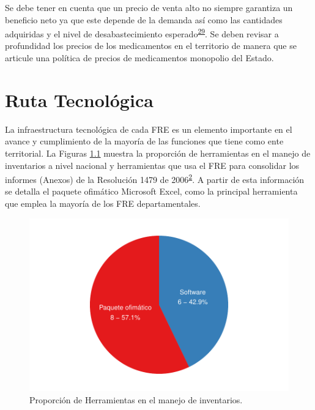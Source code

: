 \documentclass[
]{book}
\begin{document}
Se debe tener en cuenta que un precio de venta alto no siempre garantiza un beneficio neto ya que este depende de la demanda así como las cantidades adquiridas y el nivel de desabastecimiento esperado\textsuperscript{\protect\hyperlink{ref-Silver2017}{29}}. Se deben revisar a profundidad los precios de los medicamentos en el territorio de manera que se articule una política de precios de medicamentos monopolio del Estado.

\hypertarget{ruta-tecnoluxf3gica}{%
\chapter{Ruta Tecnológica}\label{ruta-tecnoluxf3gica}}


La infraestructura tecnológica de cada FRE es un elemento importante en el avance y cumplimiento de la mayoría de las funciones que tiene como ente territorial. La Figuras \ref{fig:PropHerramientasManejoInventarios} muestra la proporción de herramientas en el manejo de inventarios a nivel nacional y herramientas que usa el FRE para consolidar los informes (Anexos) de la Resolución 1479 de 2006\textsuperscript{\protect\hyperlink{ref-MSPS1479-2006}{2}}. A partir de esta información se detalla el paquete ofimático Microsoft Excel, como la principal herramienta que emplea la mayoría de los FRE departamentales.

\begin{figure}

{\centering \includegraphics[width=0.85\linewidth]{InformeFinal_files/figure-latex/PropHerramientasManejoInventarios-1} 

}

\caption{Proporción de Herramientas en el manejo de inventarios.}\label{fig:PropHerramientasManejoInventarios}
\end{figure}
\end{document}
